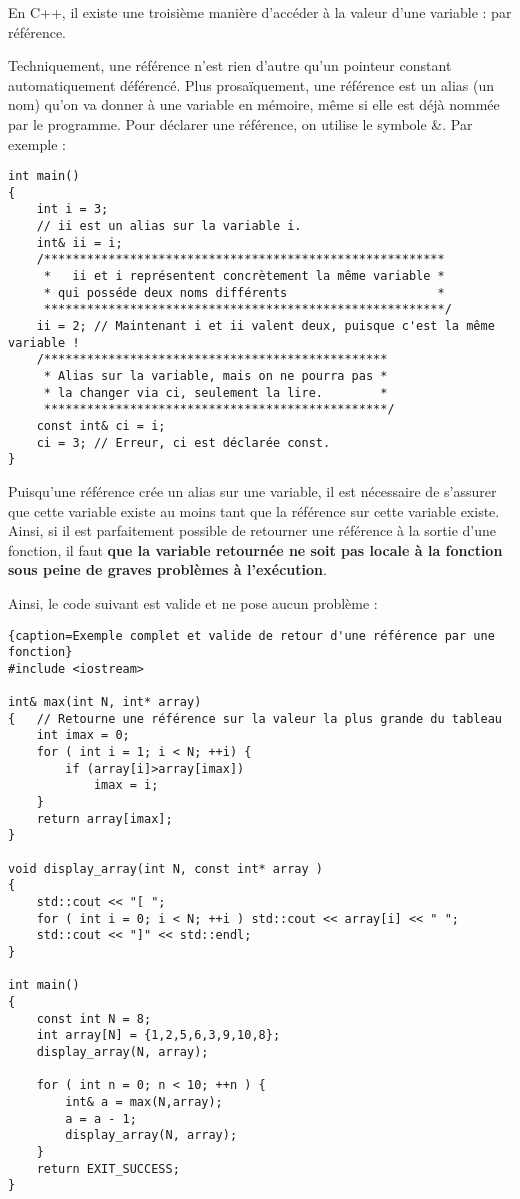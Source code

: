 En C++, il existe une troisième manière d'accéder à la valeur d'une variable : par référence. 

Techniquement, une référence n'est rien d'autre qu'un pointeur constant automatiquement déférencé. Plus prosaïquement, une référence est un alias (un nom) qu'on va donner à une variable en mémoire, même si elle est déjà nommée par le programme. Pour déclarer une référence, on utilise le symbole \&. Par exemple :

\begin{lstlisting}[caption=Exemple de référence en C++]
int main()
{
    int i = 3;
    // ii est un alias sur la variable i.
    int& ii = i; 
    /********************************************************
     *   ii et i représentent concrètement la même variable *
     * qui posséde deux noms différents                     *
     ********************************************************/
    ii = 2; // Maintenant i et ii valent deux, puisque c'est la même variable !
    /************************************************
     * Alias sur la variable, mais on ne pourra pas *
     * la changer via ci, seulement la lire.        *
     ************************************************/
    const int& ci = i;    
    ci = 3; // Erreur, ci est déclarée const.
}
\end{lstlisting}

Puisqu'une référence crée un alias sur une variable, il est nécessaire de s'assurer que cette variable existe au moins tant que la référence sur cette variable existe. Ainsi, si il est parfaitement possible de retourner une référence à la sortie d'une fonction, il faut \textbf{que la variable retournée ne soit pas locale à la fonction sous peine de graves problèmes à l'exécution}.

Ainsi, le code suivant est valide et ne pose aucun problème :

\begin{lstlisting}{caption=Exemple complet et valide de retour d'une référence par une fonction}
#include <iostream>

int& max(int N, int* array)
{   // Retourne une référence sur la valeur la plus grande du tableau
    int imax = 0;
    for ( int i = 1; i < N; ++i) {
        if (array[i]>array[imax])
            imax = i;
    }
    return array[imax];
}

void display_array(int N, const int* array )
{
    std::cout << "[ ";
    for ( int i = 0; i < N; ++i ) std::cout << array[i] << " ";
    std::cout << "]" << std::endl;
}

int main()
{
    const int N = 8;
    int array[N] = {1,2,5,6,3,9,10,8};
    display_array(N, array);

    for ( int n = 0; n < 10; ++n ) {
        int& a = max(N,array);
        a = a - 1;
        display_array(N, array);
    }
    return EXIT_SUCCESS;
}
\end{lstlisting}

